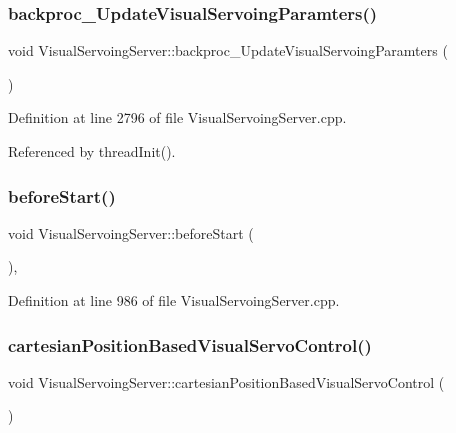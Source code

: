 \subsubsection{\texorpdfstring{backproc\+\_\+\+Update\+Visual\+Servoing\+Paramters()}{backproc\_UpdateVisualServoingParamters()}}
{\footnotesize\ttfamily void Visual\+Servoing\+Server\+::backproc\+\_\+\+Update\+Visual\+Servoing\+Paramters (\begin{DoxyParamCaption}{ }\end{DoxyParamCaption})\hspace{0.3cm}{\ttfamily [private]}}



Definition at line 2796 of file Visual\+Servoing\+Server.\+cpp.



Referenced by thread\+Init().

\mbox{\label{classVisualServoingServer_a4f23c649522804e21c7e60655a5dad99}} 
\subsubsection{\texorpdfstring{before\+Start()}{beforeStart()}}
{\footnotesize\ttfamily void Visual\+Servoing\+Server\+::before\+Start (\begin{DoxyParamCaption}{ }\end{DoxyParamCaption})\hspace{0.3cm}{\ttfamily [override]}, {\ttfamily [protected]}}



Definition at line 986 of file Visual\+Servoing\+Server.\+cpp.

\mbox{\label{classVisualServoingServer_a9ad2bd94ff95fde9e309c4fb62de7377}} 
\subsubsection{\texorpdfstring{cartesian\+Position\+Based\+Visual\+Servo\+Control()}{cartesianPositionBasedVisualServoControl()}}
{\footnotesize\ttfamily void Visual\+Servoing\+Server\+::cartesian\+Position\+Based\+Visual\+Servo\+Control (\begin{DoxyParamCaption}{ }\end{DoxyParamCaption})\hspace{0.3cm}{\ttfamily [private]}}




